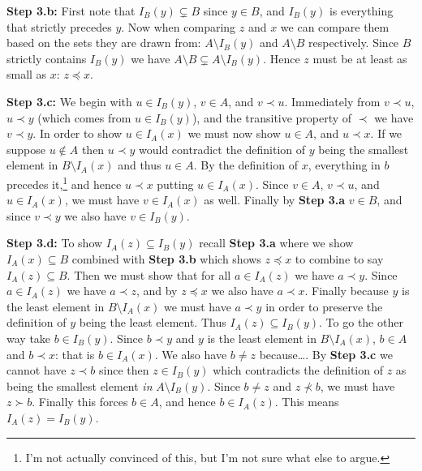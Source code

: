 \documentclass[boxes,pages,color=CornflowerBlue]{homework}
\begin{document}
\begin{solution}
    \textbf{Step 3.b:} First note that $I_B(y)\subsetneq B$ since $y \in B$, and $I_B(y)$ is everything that strictly precedes $y$.
    Now when comparing $z$ and $x$ we can compare them based on the sets they are drawn from: $A \setminus I_B(y)$ and $A \setminus B$ respectively.
    Since $B$ strictly contains $I_B(y)$ we have $A \setminus B \subsetneq A \setminus I_B(y)$.
    Hence $z$ must be at least as small as $x$: $z \preceq x$.

    \textbf{Step 3.c:} We begin with $u\in I_B(y)$, $v\in A$, and $v\prec u$.
    Immediately from $v \prec u$, $u \prec y$ (which comes from $u \in I_B(y)$), and the transitive property of $\prec$ we have $v \prec y$.
    In order to show $u \in I_A(x)$ we must now show $u \in A$, and $u \prec x$.
    If we suppose $u \notin A$ then $u \prec y$ would contradict the definition of $y$ being the smallest element in $B \setminus I_A(x)$ and thus $u \in A$.
    By the definition of $x$, everything in $b$ precedes it,\footnote{I'm not actually convinced of this, but I'm not sure what else to argue.} and hence $u \prec x$ putting $u \in I_A(x)$.
    Since $v\in A$, $v\prec u$, and $u\in I_A(x)$, we must have $v \in I_A(x)$ as well.
    Finally by \textbf{Step 3.a} $v\in B$, and since $v\prec y$ we also have $v \in I_B(y)$.

    \textbf{Step 3.d:} To show $I_A(z)\subseteq I_B(y)$ recall \textbf{Step 3.a} where we show $I_A(x) \subseteq B$ combined with \textbf{Step 3.b} which shows $z\preceq x$ to combine to say $I_A(z) \subseteq B$.
    Then we must show that for all $a \in I_A(z)$ we have $a \prec y$.
    Since $a \in I_A(z)$ we have $a\prec z$, and by $z\preceq x$ we also have $a \prec x$.
    Finally because $y$ is the least element in $B \setminus I_A(x)$ we must have $a \prec y$ in order to preserve the definition of $y$ being the least element.
    Thus $I_A(z) \subseteq I_B(y)$.
    To go the other way take $b \in I_B(y)$.
    Since $b\prec y$ and $y$ is the least element in $B \setminus I_A(x)$, $b\in A$ and $b\prec x$: that is $b\in I_A(x)$.
    We also have $b \neq z$ because\dots.
    By \textbf{Step 3.c} we cannot have $z \prec b$ since then $z\in I_B(y)$ which contradicts the definition of $z$ as being the smallest element \emph{in} $A \setminus I_B(y)$.
    Since $b \neq z$ and $z\nprec b$, we must have $z \succ b$.
    Finally this forces $b \in A$, and hence $b \in I_A(z)$.
    This means $I_A(z) = I_B(y)$.


\end{solution}
\end{document}
